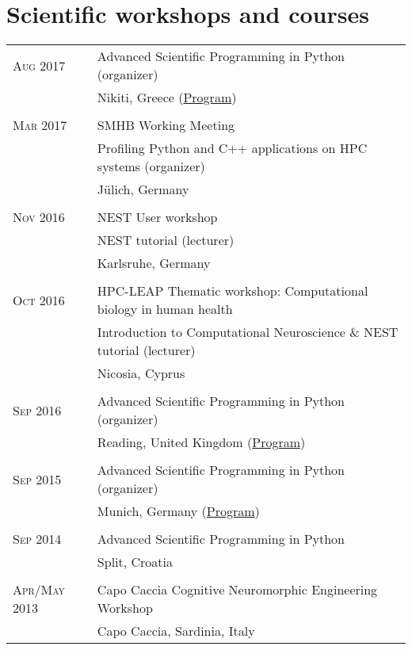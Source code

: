 \documentclass[a4paper,10pt]{article}
\begin{document}
\section{Scientific workshops and courses}
\begin{longtable}{>{\hfill}p{3.15cm}|p{10.4cm}}
  \textsc{Aug} 2017 & Advanced Scientific Programming in Python (organizer)\\
                    & \footnotesize Nikiti, Greece  (\href{https://python.g-node.org/python-summerschool-2017/}{Program}) \\
  \multicolumn{2}{c}{} \\
  \textsc{Mar} 2017 & SMHB Working Meeting \\
                    & \footnotesize Profiling Python and C++ applications on HPC systems (organizer) \\
                    & \footnotesize J\"ulich, Germany \\
  \multicolumn{2}{c}{} \\
  \textsc{Nov} 2016 & NEST User workshop \\
                    & \footnotesize NEST tutorial (lecturer) \\
                    & \footnotesize Karlsruhe, Germany \\
  \multicolumn{2}{c}{} \\
  \textsc{Oct} 2016 & HPC-LEAP Thematic workshop: Computational biology in human health \\
                    & \footnotesize Introduction to Computational Neuroscience \& NEST tutorial (lecturer) \\
                    & \footnotesize Nicosia, Cyprus \\
  \multicolumn{2}{c}{} \\
  \textsc{Sep} 2016 & Advanced Scientific Programming in Python (organizer)\\
                    &  \footnotesize Reading, United Kingdom (\href{https://python.g-node.org/python-summerschool-2016/schedule.html}{Program}) \\
  \multicolumn{2}{c}{} \\
  \textsc{Sep} 2015 & Advanced Scientific Programming in Python (organizer)\\
  &  \footnotesize Munich, Germany (\href{https://python.g-node.org/python-summerschool-2015/schedule.html}{Program})\\
  \multicolumn{2}{c}{} \\
  \textsc{Sep} 2014 & Advanced Scientific Programming in Python \\
  &  \footnotesize Split, Croatia \\
  \multicolumn{2}{c}{} \\
  \textsc{Apr}/\textsc{May} 2013 & Capo Caccia Cognitive Neuromorphic Engineering Workshop \\
  & \footnotesize Capo Caccia, Sardinia, Italy
\end{longtable}
\end{document}
